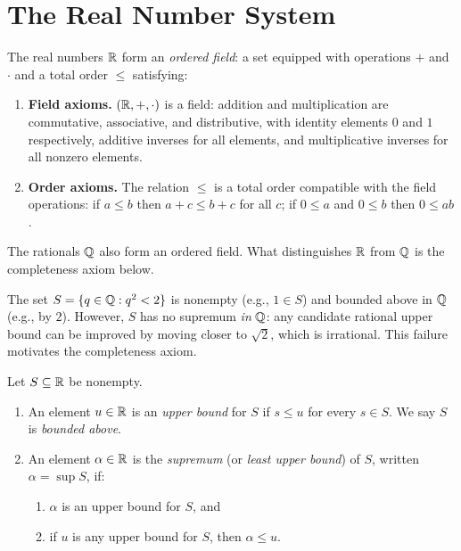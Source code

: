 \documentclass[11pt,a4paper]{article}
\begin{document}
\section{The Real Number System}
\label{sec:real_numbers}

\begin{definition}
\label{def:ordered_field}
The real numbers $\mathbb{R}$ form an \emph{ordered field}: a set equipped with
operations $+$ and $\cdot$ and a total order $\le$ satisfying:
\begin{enumerate}[nosep,label=(\roman*)]
  \item \textbf{Field axioms.} $(\mathbb{R}, +, \cdot)$ is a field: addition and
    multiplication are commutative, associative, and distributive, with
    identity elements $0$ and $1$ respectively, additive inverses for all
    elements, and multiplicative inverses for all nonzero elements.
  \item \textbf{Order axioms.} The relation $\le$ is a total order
    compatible with the field operations: if $a \le b$ then
    $a + c \le b + c$ for all $c$; if $0 \le a$ and $0 \le b$ then
    $0 \le ab$.
\end{enumerate}
\end{definition}

\begin{remark}
\label{rem:Q_ordered_field}
The rationals $\mathbb{Q}$ also form an ordered field. What distinguishes $\mathbb{R}$
from $\mathbb{Q}$ is the completeness axiom below.
\end{remark}

\begin{example}
\label{ex:Q_incomplete}
The set $S = \{q \in \mathbb{Q} : q^2 < 2\}$ is nonempty (e.g., $1 \in S$) and
bounded above in $\mathbb{Q}$ (e.g., by $2$). However, $S$ has no supremum
\emph{in} $\mathbb{Q}$: any candidate rational upper bound can be improved by
moving closer to $\sqrt{2}$, which is irrational. This failure motivates
the completeness axiom.
\end{example}

\begin{definition}
\label{def:supremum}
Let $S \subseteq \mathbb{R}$ be nonempty.
\begin{enumerate}[nosep,label=(\roman*)]
  \item An element $u \in \mathbb{R}$ is an \emph{upper bound} for $S$ if
    $s \le u$ for every $s \in S$. We say $S$ is \emph{bounded above}.
  \item An element $\alpha \in \mathbb{R}$ is the \emph{supremum} (or
    \emph{least upper bound}) of $S$, written $\alpha = \sup S$, if:
    \begin{enumerate}[nosep,label=(\alph*)]
      \item $\alpha$ is an upper bound for $S$, and
      \item if $u$ is any upper bound for $S$, then $\alpha \le u$.
    \end{enumerate}
\end{enumerate}
\end{definition}
\end{document}
